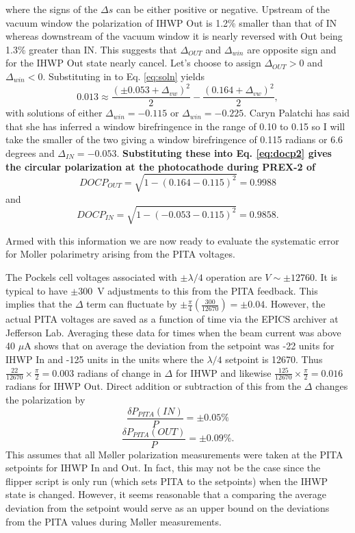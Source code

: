 \documentclass[12pt]{article}
\begin{document}
where the signs of the $\Delta s$ can be either positive or negative. Upstream of the vacuum window the polarization of IHWP Out is 1.2\% smaller than that of IN whereas downstream of the vacuum window it is nearly reversed with Out being 1.3\% greater than IN.  This suggests that $\Delta_{OUT}$ and $\Delta_{win}$ are opposite sign and for the IHWP Out state nearly cancel.  Let's choose to assign $\Delta_{OUT}>0$ and $\Delta_{win}<0$. Substituting in to Eq. \ref{eq:soln} yields
\begin{equation}
0.013 \approx \frac{\left(\pm0.053+\Delta_{vw}\right)^2}{2}-\frac{\left(0.164+\Delta_{vw}\right)^2}{2},
\end{equation}
with solutions of either $\Delta_{win}=-0.115$ or $\Delta_{win}=-0.225$. Caryn Palatchi has said that she has inferred a window birefringence in the range of 0.10 to 0.15 so I will take the smaller of the two giving a window birefringence of 0.115 radians or 6.6 degrees and $\Delta_{IN}=-0.053$.  \textbf{Substituting these into Eq. \ref{eq:docp2}  gives the circular polarization at the photocathode during PREX-2 of }
\[DOCP_{OUT}=\sqrt{1-(0.164-0.115)^2}=0.9988
\]
 and 
 \[DOCP_{IN}=\sqrt{1-(-0.053-0.115)^2}=0.9858.
 \]

Armed with this information we are now ready to evaluate the systematic error for Moller polarimetry arising from the PITA voltages.

The Pockels cell voltages associated with $\pm\lambda/4$ operation are $V\sim\pm12760$. It is typical to have $\pm300$~V adjustments to this from the PITA feedback. This implies that the $\Delta$ term can fluctuate by $\pm\frac{\pi}{4}\left(\frac{300}{12670}\right)=\pm0.04$. However, the actual PITA voltages are saved as a function of time via the EPICS archiver at Jefferson Lab. Averaging these data for times when the beam current was above 40 $\mu$A shows that on average the deviation from the setpoint was -22 units for IHWP In and -125 units in the units where the $\lambda/4$ setpoint is 12670. Thus $\frac{22}{12670}\times\frac{\pi}{2}=0.003$ radians of change in $\Delta$ for IHWP and likewise $\frac{125}{12670}\times\frac{\pi}{2}=0.016$ radians for IHWP Out. Direct addition or subtraction of this from the $\Delta$ changes the polarization by 
\[
\frac{\delta P_{PITA}(IN)}{P}=\pm0.05\% 
\]
\[
\frac{\delta P_{PITA}(OUT)}{P}=\pm0.09\%.
\]
This assumes that all M\o ller polarization measurements were taken at the PITA setpoints for IHWP In and Out. In fact, this may not be the case since the flipper script is only run (which sets PITA to the setpoints) when the IHWP state is changed. However, it seems reasonable that a comparing the average deviation from the setpoint would serve as an upper bound on the deviations from the PITA values during M\o ller measurements.
\end{document}
